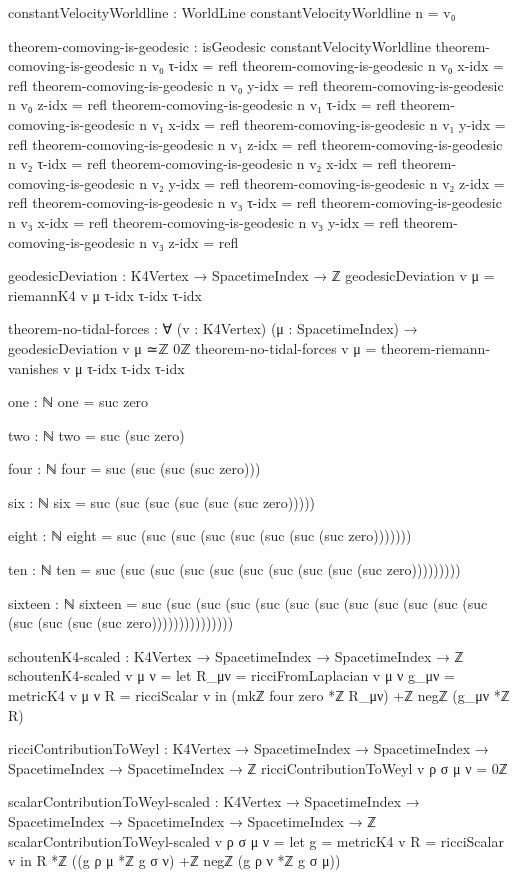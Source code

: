 \documentclass[11pt,a4paper]{book}
\begin{document}
\begin{code}
constantVelocityWorldline : WorldLine
constantVelocityWorldline n = v₀

theorem-comoving-is-geodesic : isGeodesic constantVelocityWorldline
theorem-comoving-is-geodesic n v₀ τ-idx = refl
theorem-comoving-is-geodesic n v₀ x-idx = refl
theorem-comoving-is-geodesic n v₀ y-idx = refl
theorem-comoving-is-geodesic n v₀ z-idx = refl
theorem-comoving-is-geodesic n v₁ τ-idx = refl
theorem-comoving-is-geodesic n v₁ x-idx = refl
theorem-comoving-is-geodesic n v₁ y-idx = refl
theorem-comoving-is-geodesic n v₁ z-idx = refl
theorem-comoving-is-geodesic n v₂ τ-idx = refl
theorem-comoving-is-geodesic n v₂ x-idx = refl
theorem-comoving-is-geodesic n v₂ y-idx = refl
theorem-comoving-is-geodesic n v₂ z-idx = refl
theorem-comoving-is-geodesic n v₃ τ-idx = refl
theorem-comoving-is-geodesic n v₃ x-idx = refl
theorem-comoving-is-geodesic n v₃ y-idx = refl
theorem-comoving-is-geodesic n v₃ z-idx = refl

geodesicDeviation : K4Vertex → SpacetimeIndex → ℤ
geodesicDeviation v μ = 
  riemannK4 v μ τ-idx τ-idx τ-idx

theorem-no-tidal-forces : ∀ (v : K4Vertex) (μ : SpacetimeIndex) →
  geodesicDeviation v μ ≃ℤ 0ℤ
theorem-no-tidal-forces v μ = theorem-riemann-vanishes v μ τ-idx τ-idx τ-idx

one : ℕ
one = suc zero

two : ℕ
two = suc (suc zero)

four : ℕ
four = suc (suc (suc (suc zero)))

six : ℕ
six = suc (suc (suc (suc (suc (suc zero)))))

eight : ℕ
eight = suc (suc (suc (suc (suc (suc (suc (suc zero)))))))

ten : ℕ
ten = suc (suc (suc (suc (suc (suc (suc (suc (suc (suc zero)))))))))

sixteen : ℕ
sixteen = suc (suc (suc (suc (suc (suc (suc (suc (suc (suc (suc (suc (suc (suc (suc (suc zero)))))))))))))))

schoutenK4-scaled : K4Vertex → SpacetimeIndex → SpacetimeIndex → ℤ
schoutenK4-scaled v μ ν = 
  let R_μν = ricciFromLaplacian v μ ν
      g_μν = metricK4 v μ ν
      R    = ricciScalar v
  in (mkℤ four zero *ℤ R_μν) +ℤ negℤ (g_μν *ℤ R)

ricciContributionToWeyl : K4Vertex → SpacetimeIndex → SpacetimeIndex → 
                          SpacetimeIndex → SpacetimeIndex → ℤ
ricciContributionToWeyl v ρ σ μ ν = 0ℤ

scalarContributionToWeyl-scaled : K4Vertex → SpacetimeIndex → SpacetimeIndex → 
                                   SpacetimeIndex → SpacetimeIndex → ℤ
scalarContributionToWeyl-scaled v ρ σ μ ν =
  let g = metricK4 v
      R = ricciScalar v
  in R *ℤ ((g ρ μ *ℤ g σ ν) +ℤ negℤ (g ρ ν *ℤ g σ μ))


\end{code}
\end{document}
